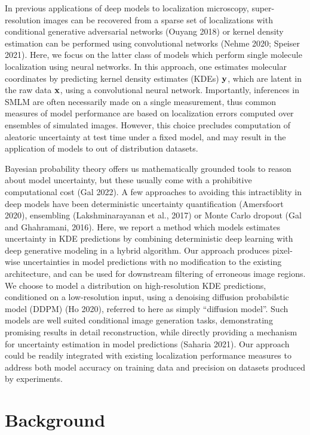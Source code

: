 \documentclass{article}
\begin{document}
In previous applications of deep models to localization microscopy, super-resolution images can be recovered from a sparse set of localizations with conditional generative adversarial networks (Ouyang 2018) or kernel density estimation can be performed using convolutional networks (Nehme 2020; Speiser 2021). Here, we focus on the latter class of models which perform single molecule localization using neural networks. In this approach, one estimates molecular coordinates by predicting kernel density estimates (KDEs) $\bold{y}$, which are latent in the raw data $\bold{x}$, using a convolutional neural network. Importantly, inferences in SMLM are often necessarily made on a single measurement, thus common measures of model performance are based on localization errors computed over ensembles of simulated images. However, this choice precludes computation of aleatoric uncertainty at test time under a fixed model, and may result in the application of models to out of distribution datasets.

Bayesian probability theory offers us mathematically grounded tools to reason about model uncertainty, but these usually come with a prohibitive computational cost (Gal 2022). A few approaches to avoiding this intractiblity in deep models have been deterministic uncertainty quantification (Amersfoort 2020), ensembling (Lakshminarayanan et al., 2017) or Monte Carlo dropout (Gal and Ghahramani, 2016). Here, we report a method which models estimates uncertainty in KDE predictions by combining deterministic deep learning with deep generative modeling in a hybrid algorithm. Our approach produces pixel-wise uncertainties in model predictions with no modification to the existing architecture, and can be used for downstream filtering of erroneous image regions. We choose to model a distribution on high-resolution KDE predictions, conditioned on a low-resolution input, using a denoising diffusion probabilstic model (DDPM) (Ho 2020), referred to here as simply ``diffusion model''. Such models are well suited conditional image generation tasks, demonstrating promising results in detail reconstruction, while directly providing a mechanism for uncertainty estimation in model predictions (Saharia 2021). Our approach could be readily integrated with existing localization performance measures to address both model accuracy on training data and precision on datasets produced by experiments. 

\section{Background}
\end{document}
